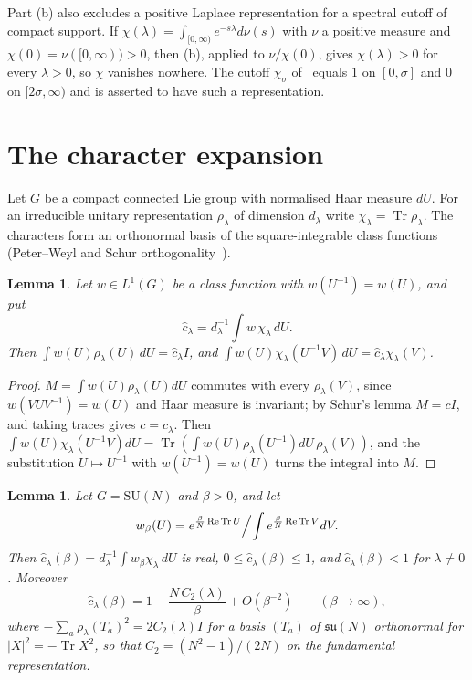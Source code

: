 \documentclass[11pt]{amsart}
\newtheorem{lemma}[theorem]{Lemma}
\theoremstyle{definition}
\theoremstyle{remark}
\numberwithin{equation}{section}
\newcommand{\SU}{\mathrm{SU}}
\newcommand{\Tr}{\operatorname{Tr}}
\newcommand{\ReTr}{\operatorname{Re}\operatorname{Tr}}
\begin{document}
Part (b) also excludes a positive Laplace representation for a spectral
cutoff of compact support. If $\chi(\lambda)=\int_{[0,\infty)}e^{-s\lambda}
d\nu(s)$ with $\nu$ a positive measure and $\chi(0)=\nu([0,\infty))>0$, then
(b), applied to $\nu/\chi(0)$, gives $\chi(\lambda)>0$ for every $\lambda>0$, so
$\chi$ vanishes nowhere. The cutoff $\chi_\sigma$ of~\cite[Sec.~9,
Eqs.~(9.11), (9.12)]{FaS26} equals $1$ on $[0,\sigma]$ and $0$ on
$[2\sigma,\infty)$ and is asserted to have such a representation.

\section{The character expansion}\label{app:characters}

Let $G$ be a compact connected Lie group with normalised Haar measure $dU$.
For an irreducible unitary representation $\rho_\lambda$ of dimension
$d_\lambda$ write $\chi_\lambda=\Tr\rho_\lambda$. The characters form an
orthonormal basis of the square-integrable class functions
(Peter--Weyl and Schur orthogonality~\cite[Chs.~2--4]{Bum13}).

\begin{lemma}\label{lem:convolution}
Let $w\in L^1(G)$ be a class function with $w(U^{-1})=w(U)$, and put
\[
\hat c_\lambda=d_\lambda^{-1}\int w\,\chi_\lambda\,dU .
\]
Then $\int
w(U)\rho_\lambda(U)\,dU=\hat c_\lambda I$, and
$\int w(U)\chi_\lambda(U^{-1}V)\,dU=\hat c_\lambda\chi_\lambda(V)$.
\end{lemma}

\begin{proof}
$M=\int w(U)\rho_\lambda(U)dU$ commutes with every $\rho_\lambda(V)$, since
$w(VUV^{-1})=w(U)$ and Haar measure is invariant; by Schur's lemma
$M=cI$, and taking traces gives $c=\hat c_\lambda$. Then $\int
w(U)\chi_\lambda(U^{-1}V)dU=\Tr(\int w(U)\rho_\lambda(U^{-1})dU\,
\rho_\lambda(V))$, and the substitution $U\mapsto U^{-1}$ with
$w(U^{-1})=w(U)$ turns the integral into $M$.
\end{proof}

\begin{lemma}\label{lem:wilsoncoeff}
Let $G=\SU(N)$ and $\beta>0$, and let
\[
w_\beta(U)=e^{\frac\beta N\ReTr U}\Bigl/\int e^{\frac\beta N\ReTr V}dV .
\]
Then $\hat c_\lambda(\beta)=d_\lambda^{-1}\int
w_\beta\chi_\lambda\,dU$ is real, $0\le\hat c_\lambda(\beta)\le1$, and
$\hat c_\lambda(\beta)<1$ for $\lambda\ne0$. Moreover
\[
\hat c_\lambda(\beta)=1-\frac{N\,C_2(\lambda)}\beta+O(\beta^{-2})\qquad
(\beta\to\infty),
\]
where $-\sum_a\rho_\lambda(T_a)^2=2C_2(\lambda)I$ for a basis $(T_a)$ of
$\mathfrak{su}(N)$ orthonormal for $|X|^2=-\Tr X^2$, so that
$C_2=(N^2-1)/(2N)$ on the fundamental representation.
\end{lemma}
\end{document}
